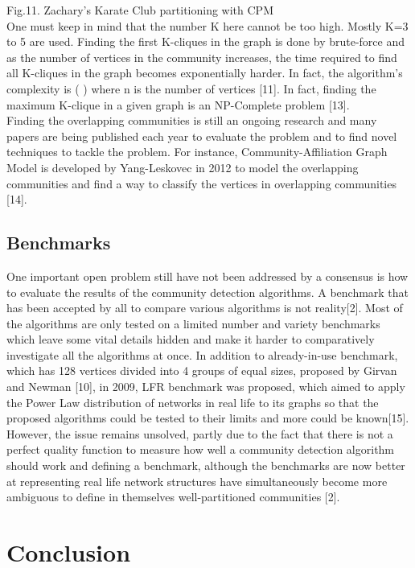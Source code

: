 \documentclass[10pt]{article}
\begin{document}
Fig.11. Zachary’s Karate Club partitioning with CPM \\

One must keep in mind that the number K here cannot be too high. Mostly K=3 to 5 are used. Finding the first K-cliques in the graph is done by brute-force and as the number of vertices in the community increases, the time required to find all K-cliques in the graph becomes exponentially harder. In fact, the algorithm’s complexity is ( ) where n is the number of vertices [11]. In fact, finding the maximum K-clique in a given graph is an NP-Complete problem [13]. \\

Finding the overlapping communities is still an ongoing research and many papers are being published each year to evaluate the problem and to find novel techniques to tackle the problem. For instance, Community-Affiliation Graph Model is developed by Yang-Leskovec in 2012 to model the overlapping communities and find a way to classify the vertices in overlapping communities [14]. \\

\subsection{Benchmarks}
One important open problem still have not been addressed by a consensus is how to evaluate the results of the community detection algorithms. A benchmark that has been accepted by all to compare various algorithms is not reality[2]. Most of the algorithms are only tested on a limited number and variety benchmarks which leave some vital details hidden and make it harder to comparatively investigate all the algorithms at once. In addition to already-in-use benchmark, which has 128 vertices divided into 4 groups of equal sizes, proposed by Girvan and Newman [10], in 2009, LFR benchmark was proposed, which aimed to apply the Power Law distribution of networks in real life to its graphs so that the proposed algorithms could be tested to their limits and more could be known[15]. However, the issue remains unsolved, partly due to the fact that there is not a perfect quality function to measure how well a community detection algorithm should work and defining a benchmark, although the benchmarks are now better at representing real life network structures have simultaneously become more ambiguous to define in themselves well-partitioned communities [2]. \\

\section{Conclusion} 
\end{document}
